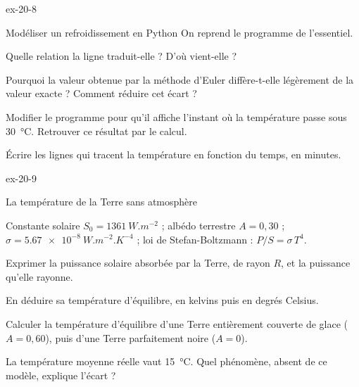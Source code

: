 \begin{blocLivre}{ex-20-8}
\begin{exercice}[2]{Modéliser un refroidissement en Python}
On reprend le programme de l'essentiel.
\begin{questions}
\item {}Quelle relation la ligne  traduit-elle ? D'où
vient-elle ?
\item Pourquoi la valeur obtenue par la méthode d'Euler diffère-t-elle légèrement de la valeur exacte ? Comment réduire
cet écart ?
\item Modifier le programme pour qu'il affiche l'instant où la température passe sous \qty{30}{\degreeCelsius}. Retrouver ce
résultat par le calcul.
\item Écrire les lignes qui tracent la température en fonction du temps, en minutes.
\end{questions}
\end{exercice}
\end{blocLivre}
\begin{blocLivre}{ex-20-9}
\begin{exercice}[2]{La température de la Terre sans atmosphère}
\begin{donnees}
Constante solaire $S_0=\qty{1361}{W.m^{-2}}$ ; albédo terrestre $A=0{,}30$ ; $\sigma=\qty{5,67e-8}{W.m^{-2}.K^{-4}}$ ; loi de
Stefan-Boltzmann : $P/S=\sigma\,T^4$.
\end{donnees}
\begin{questions}
\item Exprimer la puissance solaire absorbée par la Terre, de rayon $R$, et la puissance qu'elle rayonne.
\item En déduire sa température d'équilibre, en kelvins puis en degrés Celsius.
\item Calculer la température d'équilibre d'une Terre entièrement couverte de glace ($A=0{,}60$), puis d'une Terre
parfaitement noire ($A=0$).
\item La température moyenne réelle vaut \qty{15}{\degreeCelsius}. Quel phénomène, absent de ce modèle, explique l'écart ?
\end{questions}
\end{exercice}
\end{blocLivre}
